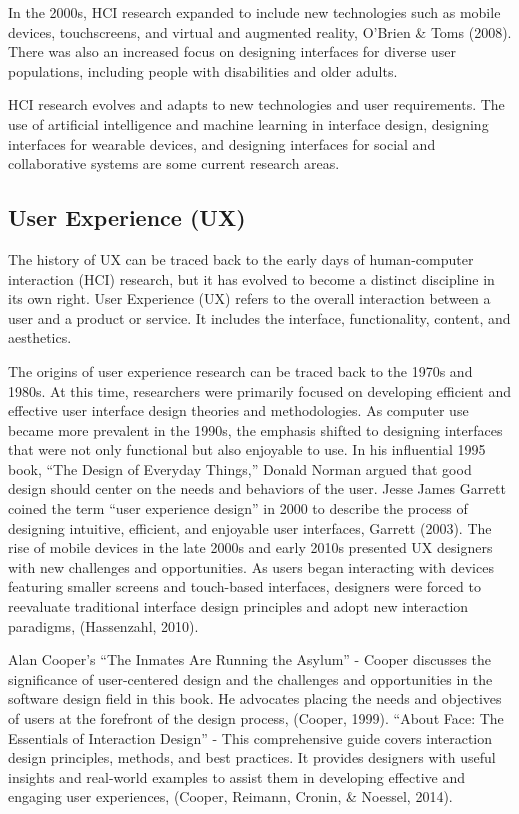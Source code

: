 \documentclass[print]{nuthesis}
\begin{document}
In the 2000s, HCI research expanded to include new technologies such as mobile devices, touchscreens, and virtual and augmented reality, O'Brien \& Toms (2008).
There was also an increased focus on designing interfaces for diverse user populations, including people with disabilities and older adults.

HCI research evolves and adapts to new technologies and user requirements.
The use of artificial intelligence and machine learning in interface design, designing interfaces for wearable devices, and designing interfaces for social and collaborative systems are some current research areas.

\hypertarget{user-experience-ux}{%
\subsection{User Experience (UX)}\label{user-experience-ux}}

The history of UX can be traced back to the early days of human-computer interaction (HCI) research, but it has evolved to become a distinct discipline in its own right. User Experience (UX) refers to the overall interaction between a user and a product or service. It includes the interface, functionality, content, and aesthetics.

The origins of user experience research can be traced back to the 1970s and 1980s.
At this time, researchers were primarily focused on developing efficient and effective user interface design theories and methodologies.
As computer use became more prevalent in the 1990s, the emphasis shifted to designing interfaces that were not only functional but also enjoyable to use.
In his influential 1995 book, ``The Design of Everyday Things,'' Donald Norman argued that good design should center on the needs and behaviors of the user.
Jesse James Garrett coined the term ``user experience design'' in 2000 to describe the process of designing intuitive, efficient, and enjoyable user interfaces, Garrett (2003).
The rise of mobile devices in the late 2000s and early 2010s presented UX designers with new challenges and opportunities.
As users began interacting with devices featuring smaller screens and touch-based interfaces, designers were forced to reevaluate traditional interface design principles and adopt new interaction paradigms, (Hassenzahl, 2010).

Alan Cooper's ``The Inmates Are Running the Asylum'' - Cooper discusses the significance of user-centered design and the challenges and opportunities in the software design field in this book.
He advocates placing the needs and objectives of users at the forefront of the design process, (Cooper, 1999).
``About Face: The Essentials of Interaction Design'' - This comprehensive guide covers interaction design principles, methods, and best practices.
It provides designers with useful insights and real-world examples to assist them in developing effective and engaging user experiences, (Cooper, Reimann, Cronin, \& Noessel, 2014).
\end{document}
